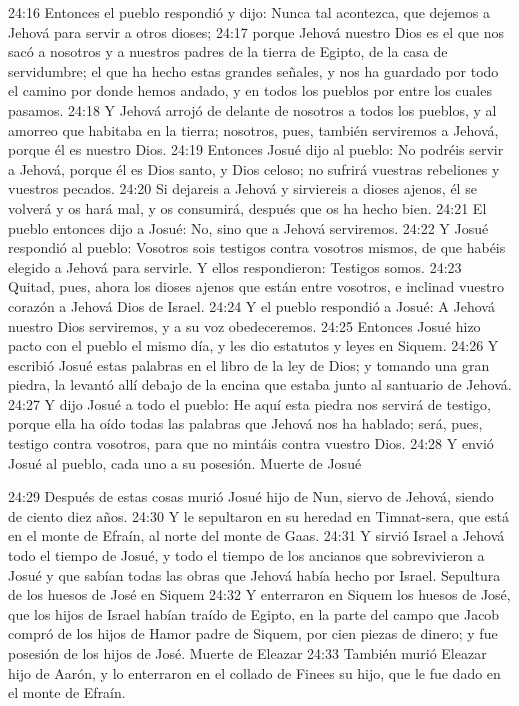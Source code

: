 24:16 Entonces el pueblo respondió y dijo: Nunca tal acontezca, que dejemos a Jehová para servir a otros dioses;  
24:17 porque Jehová nuestro Dios es el que nos sacó a nosotros y a nuestros padres de la tierra de Egipto, de la casa de servidumbre; el que ha hecho estas grandes señales, y nos ha guardado por todo el camino por donde hemos andado, y en todos los pueblos por entre los cuales pasamos.  
24:18 Y Jehová arrojó de delante de nosotros a todos los pueblos, y al amorreo que habitaba en la tierra; nosotros, pues, también serviremos a Jehová, porque él es nuestro Dios.  
24:19 Entonces Josué dijo al pueblo: No podréis servir a Jehová, porque él es Dios santo, y Dios celoso; no sufrirá vuestras rebeliones y vuestros pecados.  
24:20 Si dejareis a Jehová y sirviereis a dioses ajenos, él se volverá y os hará mal, y os consumirá, después que os ha hecho bien.  
24:21 El pueblo entonces dijo a Josué: No, sino que a Jehová serviremos.  
24:22 Y Josué respondió al pueblo: Vosotros sois testigos contra vosotros mismos, de que habéis elegido a Jehová para servirle. Y ellos respondieron: Testigos somos.  
24:23 Quitad, pues, ahora los dioses ajenos que están entre vosotros, e inclinad vuestro corazón a Jehová Dios de Israel.  
24:24 Y el pueblo respondió a Josué: A Jehová nuestro Dios serviremos, y a su voz obedeceremos.  
24:25 Entonces Josué hizo pacto con el pueblo el mismo día, y les dio estatutos y leyes en Siquem.  
24:26 Y escribió Josué estas palabras en el libro de la ley de Dios; y tomando una gran piedra, la levantó allí debajo de la encina que estaba junto al santuario de Jehová.  
24:27 Y dijo Josué a todo el pueblo: He aquí esta piedra nos servirá de testigo, porque ella ha oído todas las palabras que Jehová nos ha hablado; será, pues, testigo contra vosotros, para que no mintáis contra vuestro Dios.  
24:28 Y envió Josué al pueblo, cada uno a su posesión.  
Muerte de Josué  
 
24:29 Después de estas cosas murió Josué hijo de Nun, siervo de Jehová, siendo de ciento diez años.  
24:30 Y le sepultaron en su heredad en Timnat-sera, que está en el monte de Efraín, al norte del monte de Gaas.  
24:31 Y sirvió Israel a Jehová todo el tiempo de Josué, y todo el tiempo de los ancianos que sobrevivieron a Josué y que sabían todas las obras que Jehová había hecho por Israel.  
Sepultura de los huesos de José en Siquem  
24:32 Y enterraron en Siquem los huesos de José, que los hijos de Israel habían traído de Egipto, en la parte del campo que Jacob compró de los hijos de Hamor padre de Siquem, por cien piezas de dinero; y fue posesión de los hijos de José.  
Muerte de Eleazar  
24:33 También murió Eleazar hijo de Aarón, y lo enterraron en el collado de Finees su hijo, que le fue dado en el monte de Efraín.
